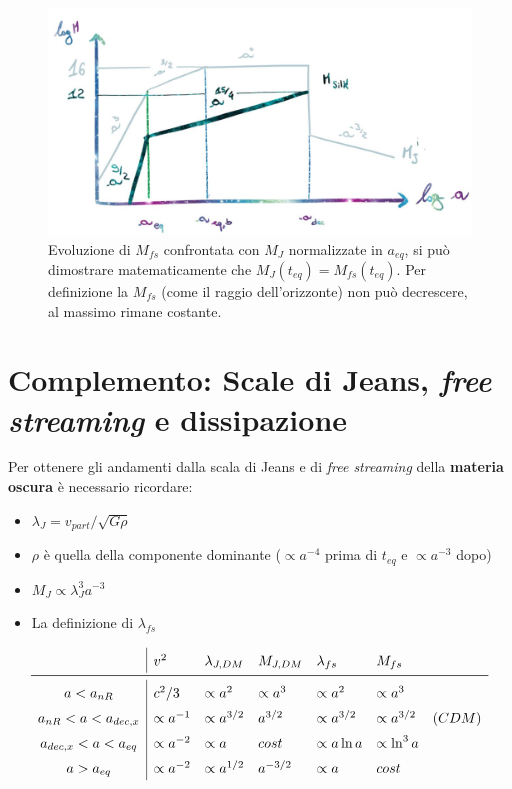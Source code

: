 \begin{figure}[H]
    \centering
    \includegraphics[width=.8 \textwidth]{Pictures/7/msilkbar.jpg}
    \caption{Evoluzione di $M_{fs}$ confrontata con $M_J$ normalizzate in $a_{eq}$, si può dimostrare matematicamente che $M_J(t_{eq})=M_{fs}(t_{eq})$. Per definizione la $M_{fs}$ (come il raggio dell'orizzonte) non può decrescere, al massimo rimane costante.} \label{fig:7mfscold}
\end{figure}




\section{Complemento: Scale di Jeans, \textit{free streaming} e dissipazione}\label{ch7:complementi}

Per ottenere gli andamenti dalla scala di Jeans e di \textit{free streaming} della \textbf{materia oscura} è necessario ricordare:
\begin{itemize}
    \item $\lambda_J = v_{part}/\sqrt{G\rho}$
    \item $\rho$ è quella della componente dominante ($\propto a^{-4}$ prima di $t_{eq}$ e $\propto a^{-3}$ dopo)
    \item $M_J\propto \lambda_J^3 a^{-3}$
    \item La definizione di $\lambda_{fs}$
\end{itemize}

\begin{equation}\left.
    \def\arraystretch{1.5}
        \begin{array}{c|llllll}
         & v^2 & \lambda_{J,DM} & M_{J,DM} & \lambda_{fs}& M_{fs} & \\ \midrule
        a < a_{nR} & c^2/3 & \propto a^2  & \propto a^3 & \propto a^2 & \propto a^3  & \\
        a_{nR}< a < a_{dec,x} & \propto a^{-1} & \propto a^{3/2} &  a^{3/2} & \propto a^{3/2} & \propto a^{3/2} & (CDM) \\
        a_{dec,x}< a < a_{eq} & \propto a^{-2}  & \propto a & cost & \propto a\ln a & \propto \ln^3 a& \\
        a > a_{eq} & \propto a^{-2} & \propto a^{1/2} &  a^{-3/2} &\propto a  & cost &
    \end{array}\right. \label{tab:7jfsdm}
\end{equation}


